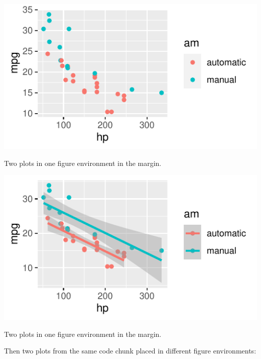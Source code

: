\documentclass[
  letterpaper,
  DIV=11,
  numbers=noendperiod,
  oneside]{scrartcl}
\begin{document}
\begin{marginfigure}

{\centering \includegraphics{cv_files/figure-pdf/fig-margin-together-1.pdf}

}

\caption{\label{fig-margin-together-1}Two plots in one figure
environment in the margin.}

\end{marginfigure}

\begin{marginfigure}

{\centering \includegraphics{cv_files/figure-pdf/fig-margin-together-2.pdf}

}

\caption{\label{fig-margin-together-2}Two plots in one figure
environment in the margin.}

\end{marginfigure}

Then two plots from the same code chunk placed in different figure
environments:
\end{document}
